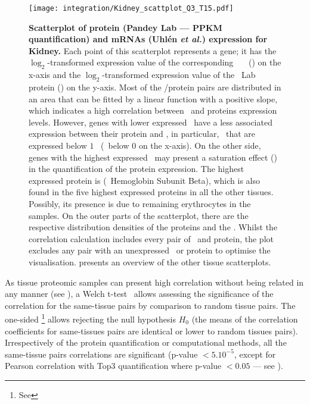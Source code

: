 \begin{figure}[!htbp]
    \texttt{[image: integration/Kidney\_scattplot\_Q3\_T15.pdf]}\centering
    \caption[Scatterplot of protein (Pandey Lab data --- PPKM quantification)
    and mRNA (Uhlén \etal) expression for Kidney]
    {\label{fig:ScatKid}\textbf{Scatterplot of
    protein (Pandey Lab --- PPKM quantification) and mRNAs (Uhlén \textit{et al.})
    expression for Kidney.}
    Each point of this scatterplot represents a gene;
    it has the $\log_2$-transformed expression value
    of the corresponding \uhlen\ \etal\ \mRNA\ (\FPKM) on the x-axis and
    the $\log_2$-transformed expression value of
    the \pandey\ Lab protein (\PPKM) on the y-axis.
    Most of the \mRNA/protein pairs are distributed in an area
    that can be fitted by a linear function with a positive slope,
    which indicates a high correlation between \mRNAs\ and proteins expression
    levels.
    However, genes with lower expressed \mRNAs\ have
    a less associated expression between their protein and \mRNA,
    in particular, \mRNAs\ that are expressed
    below $1$ \FPKM\ (\ie\ below $0$ on the x-axis).
    On the other side, genes with the highest expressed \mRNAs\ may present
    a saturation effect ()
    in the quantification of the protein expression.
    The highest expressed protein is 
    (\ie\ Hemoglobin Subunit Beta), which is also found in
    the five highest expressed proteins in all the other tissues.
    Possibly, its presence is due to remaining erythrocytes in the samples.
    On the outer parts of the scatterplot,
    there are the respective distribution densities of the proteins and the \mRNAs.
    Whilst the correlation calculation includes every pair of \mRNA\ and protein,
    the plot excludes any pair with an unexpressed \mRNA\ or protein to optimise the visualisation.
     presents an overview of the other tissue scatterplots.
    }
\end{figure}

As tissue proteomic samples can present high correlation
without being related in any manner
(see ),
a Welch t-test~ allows
assessing the significance of the correlation for the same-tissue pairs
by comparison to random tissue pairs.
The one-sided \Welchttest\footnote{See }
allows rejecting the null hypothesis $H_0$
(the means of the correlation coefficients for same-tissues pairs
are identical or lower to random tissues pairs).
Irrespectively of the protein quantification or computational methods,
all the same-tissue pairs correlations are significant
(p-value $<5.10^{-5}$, except for Pearson correlation with Top3 quantification
where p-value $<0.05$ --- see ).\mybr\

